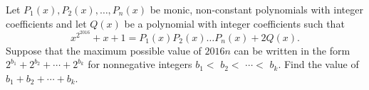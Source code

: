 Let $P_1(x),P_2(x),\ldots,P_n(x)$ be monic, non-constant polynomials with integer coefficients and let $Q(x)$ be a polynomial with integer coefficients such that \[x^{2^{2016}}+x+1=P_1(x)P_2(x)\ldots P_n(x)+2Q(x).\] Suppose that the maximum possible value of $2016n$ can be written in the form $2^{b_1}+2^{b_2}+\cdots+2^{b_k}$ for nonnegative integers $b_1<$ $b_2<$ $\cdots<$ $b_k$. Find the value of $b_1+b_2+\cdots+b_k$.
